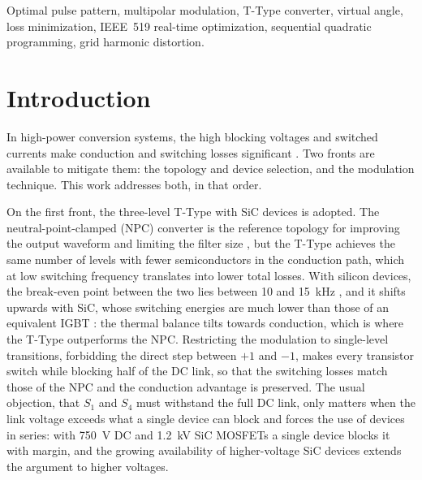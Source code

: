 \documentclass[conference]{IEEEtran}
\newcommand{\upd}[1]{\par\smallskip\noindent{\color{red}\footnotesize
    \textbf{[ACTUALIZAR]} #1}\par\smallskip}
\newcommand{\sug}[1]{\par\smallskip\noindent{\color{green!45!black}\footnotesize
    \textbf{[SUGERENCIA]} #1}\par\smallskip}
\begin{document}
\begin{IEEEkeywords}
Optimal pulse pattern, multipolar modulation, T-Type converter, virtual angle,
loss minimization, IEEE~519
real-time optimization, sequential
quadratic programming, grid harmonic distortion.
\end{IEEEkeywords}

\section{Introduction}

In high-power conversion systems, the high blocking voltages and switched
currents make conduction and switching losses significant
\cite{zhang_hpm,edpuganti_survey}. Two fronts are available to mitigate them:
the topology and device selection, and the modulation technique. This work
addresses both, in that order.

On the first front, the three-level T-Type with SiC devices is adopted. The
neutral-point-clamped (NPC) converter is the reference topology for improving the
output waveform and limiting the filter size \cite{lee_npc_ttype}, but the T-Type
achieves the same number of levels with fewer semiconductors in the conduction
path, which at low switching frequency translates into lower total losses.
With silicon devices, the break-even point between the two lies between 10
and 15~kHz \cite{alemi_ttype}, and it shifts upwards with SiC, whose switching
energies are much lower than those of an equivalent IGBT
\cite{yang_sic_gan}: the thermal balance tilts
towards conduction, which is where the T-Type outperforms the NPC. Restricting
the modulation to single-level transitions, forbidding the direct step between
$+1$ and $-1$, makes every transistor switch while blocking half of the DC link,
so that the switching losses match those of the NPC and the conduction advantage
is preserved. The usual objection, that $S_1$ and $S_4$ must withstand the full
DC link, only matters when the link voltage exceeds what a single device can block
and forces the use of devices in series: with 750~V DC and 1.2~kV SiC MOSFETs a single
device blocks it with margin, and the growing availability of higher-voltage SiC
devices \cite{narasimhan_sic,nielsen_10kv} extends the argument to higher
voltages.
\end{document}
